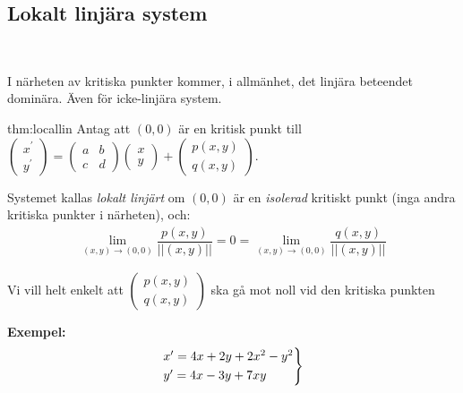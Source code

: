 \subsection{Lokalt linjära system}\hfill\\
\par\bigskip
\noindent I närheten av kritiska punkter kommer, i allmänhet, det linjära beteendet dominära. Även för icke-linjära system.
\par\bigskip
\begin{theo}{thm:locallin}
  Antag att $(0,0)$ är en kritisk punkt till $\begin{pmatrix}x^{\prime}\\y^{\prime}\end{pmatrix} = \begin{pmatrix}a&b\\c&d\end{pmatrix}\begin{pmatrix}x\\y\end{pmatrix} + \begin{pmatrix}p(x,y)\\q(x,y)\end{pmatrix}$.
  \par\bigskip
  \noindent Systemet kallas \textit{lokalt linjärt} om $(0,0)$ är en \textit{isolerad} kritiskt punkt (inga andra kritiska punkter i närheten), och:
  \begin{equation*}
    \begin{gathered}
      \lim_{(x,y)\to(0,0)}\dfrac{p(x,y)}{\left|\left|(x,y)\right|\right|} = 0 = \lim_{(x,y)\to(0,0)}\dfrac{q(x,y)}{\left|\left|(x,y)\right|\right|}
    \end{gathered}
  \end{equation*}
  \par\bigskip
  \noindent Vi vill helt enkelt att $\begin{pmatrix}p(x,y)\\q(x,y)\end{pmatrix}$ ska gå mot noll vid den kritiska punkten
\end{theo}
\par\bigskip
\noindent\textbf{Exempel:}
\begin{equation*}
  \begin{gathered}
    \begin{rcases*}
      x^{\prime} = 4x+2y+2x^2-y^2\\
      y^{\prime} = 4x-3y+7xy
    \end{rcases*}
  \end{gathered}
\end{equation*}
